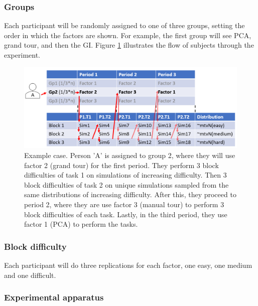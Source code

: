 \documentclass[
  11,
]{article}
\begin{document}
\hypertarget{sec:groups}{%
\subsubsection{Groups}\label{sec:groups}}

Each participant will be randomly assigned to one of three groups, setting the order in which the factors are shown. For example, the first group will see PCA, grand tour, and then the GI. Figure \ref{fig:designExample} illustrates the flow of subjects through the experiment.

\begin{figure}[h]

{\centering \includegraphics[width=1\linewidth,]{./figures/experimental_design_personA} 

}

\caption{Example case. Person 'A' is assigned to group 2, where they will use factor 2 (grand tour) for the first period. They perform 3 block difficulties of task 1 on simulations of increasing difficulty. Then 3 block difficulties of task 2 on unique simulations sampled from the same distributions of increasing difficulty. After this, they proceed to period 2, where they are use factor 3 (manual tour) to perform 3 block difficulties of each task. Lastly, in the third period, they use factor 1 (PCA) to perform the tasks.}\label{fig:designExample}
\end{figure}

\hypertarget{sec:blocks}{%
\subsubsection{Block difficulty}\label{sec:blocks}}

Each participant will do three replications for each factor, one easy, one medium and one difficult.

\hypertarget{experimental-apparatus}{%
\subsubsection{Experimental apparatus}\label{experimental-apparatus}}
\end{document}
